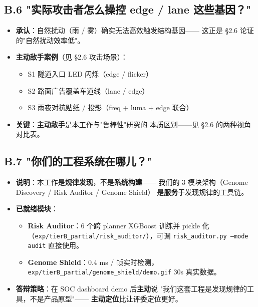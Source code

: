 \documentclass[a4paper,12pt,fontset=fandol]{ctexart}
\begin{document}
{\subsection*{B.6 "实际攻击者怎么操控 edge / lane 这些基因？"}

\begin{itemize}[leftmargin=*]
\item \textbf{承认}：自然扰动（雨 / 雾）确实无法高效触发结构基因——
      这正是 §2.6 论证的"自然扰动效率低"。
\item \textbf{主动敌手案例}（见 §2.6 攻击场景）：
  \begin{itemize}
  \item S1 隧道入口 LED 闪烁（edge / flicker）
  \item S2 路面广告覆盖车道线（lane / edge）
  \item S3 雨夜对抗贴纸 / 投影（freq + luma + edge 联合）
  \end{itemize}
\item \textbf{关键}：\textbf{主动敌手}是本工作与"鲁棒性"研究的
      本质区别——见 §2.6 的两种视角对比表。
\end{itemize}

\subsection*{B.7 "你们的工程系统在哪儿？"}

\begin{itemize}[leftmargin=*]
\item \textbf{说明}：本工作是\textbf{规律发现}，不是\textbf{系统构建}——
      我们的 3 模块架构（Genome Discovery / Risk Auditor / Genome Shield）
      是\textbf{服务}于发现规律的工具链。
\item \textbf{已就绪模块}：
  \begin{itemize}
  \item \textbf{Risk Auditor}：6 个跨 planner XGBoost 训练并 pickle 化
        （\texttt{exp/tierB\_partial/risk\_auditor/}），可调
        \texttt{risk\_auditor.py --mode audit} 直接使用。
  \item \textbf{Genome Shield}：0.4 ms / 帧实时检测，
        \texttt{exp/tierB\_partial/genome\_shield/demo.gif} 30s 真实数据。
  \end{itemize}
\item \textbf{答辩策略}：在 SOC dashboard demo 后\textbf{主动}说
      "我们这套工程是发现规律的工具，不是产品原型"——
      \textbf{主动定位}比让评委定位更好。
\end{itemize}

}
\end{document}
